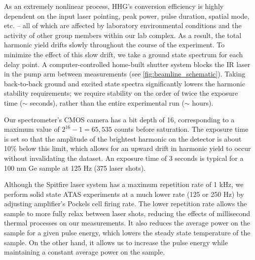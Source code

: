 As an extremely nonlinear process, HHG's conversion efficiency is highly dependent on the input laser pointing, peak power, pulse duration, spatial mode, etc. -- all of which are affected by laboratory environmental conditions and the activity of other group members within our lab complex. As a result, the total harmonic yield drifts slowly throughout the course of the experiment. To minimize the effect of this slow drift, we take a ground state spectrum for each delay point. A computer-controlled home-built shutter system blocks the IR laser in the pump arm between measurements (see \cref{fig:beamline_schematic}). Taking back-to-back ground and excited state spectra significantly lowers the harmonic stability requirements; we require stability on the order of twice the exposure time ($\sim$ seconds), rather than the entire experimental run ($\sim$ hours).

Our spectrometer's CMOS camera has a bit depth of 16, corresponding to a maximum value of $2^{16}-1 = 65,535$ counts before saturation. The exposure time is set so that the amplitude of the brightest harmonic on the detector is about 10\% below this limit, which allows for an upward drift in harmonic yield to occur without invalidating the dataset. An exposure time of 3 seconds is typical for a 100 nm Ge sample at 125 Hz (375 laser shots).

Although the Spitfire laser system has a maximum repetition rate of 1 kHz, we perform solid state ATAS experiments at a much lower rate (125 or 250 Hz) by adjusting amplifier's Pockels cell firing rate. The lower repetition rate allows the sample to more fully relax between laser shots, reducing the effects of millisecond thermal processes on our measurements. It also reduces the average power on the sample for a given pulse energy, which lowers the steady state temperature of the sample. On the other hand, it allows us to increase the pulse energy while maintaining a constant average power on the sample.

